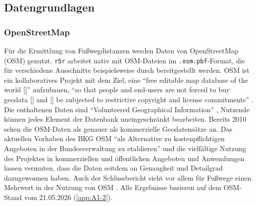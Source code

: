 \documentclass[11pt,pdftex,a4paper]{scrartcl}
\begin{document}
	\subsection{Datengrundlagen}
	\label{sec:Datengrundlagen}
	\subsubsection{OpenStreetMap}
	Für die Ermittlung von Fußwegdistanzen werden Daten von OpenStreetMap (OSM) genutzt. \texttt{r5r} arbeitet nativ mit OSM-Dateien im \texttt{.osm.pbf}-Format, die für verschiedene Ausschnitte beispielsweise durch \textcite{GeofabrikOSMExtracts} bereitgestellt werden. OSM ist ein kollaboratives Projekt mit dem Ziel, eine \enquote{free editable map database of the world [\textellipsis]} aufzubauen, \enquote{so that people and end-users are not forced to buy	geodata [\textellipsis] and [\textellipsis] be subjected to restrictive	copyright and license commitments} \parencite[2]{jokararsanjaniOpenStreetMapGIScienceExperiences2015}. Die enthaltenen Daten sind \enquote{Volunteered Geographical Information} \parencite{goodchildCitizensSensorsWorld2007}, Nutzende können jedes Element der Datenbank uneingeschränkt bearbeiten. Bereits 2010 sehen \textcite{zielstra2010quantitative} die OSM-Daten als genauer als kommerzielle Geodatensätze an. Das aktuellen Vorhaben des BKG OSM \enquote{als Alternative zu kostenpflichtigen Angeboten in der Bundesverwaltung zu etablieren} \parencite{bkgosm2026} und die vielfältige Nutzung des Projektes in kommerziellen und öffentlichen Angeboten und Anwendungen \parencite[vgl.][]{openstreetmapwikiTheyAreUsing2026} lassen vermuten, dass die Daten seitdem an Genaugkeit und Detailgrad dazugewonnen haben. Auch der Schlussbericht sieht vor allem für Fußwege einen Mehrwert in der Nutzung von OSM \parencite[78]{kcwgmbhMethodikUndEmpfehlungen2024}. Alle Ergebnisse basieren auf dem OSM-Stand vom 21.05.2026 (\ref{app:A1-2}).
\end{document}
